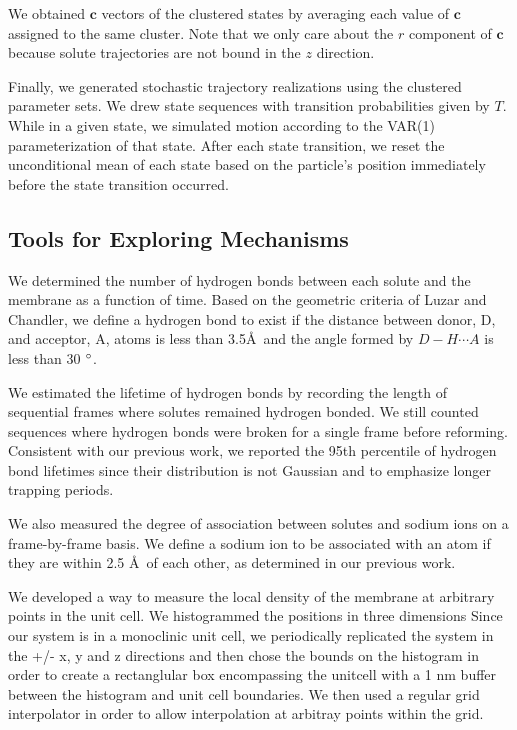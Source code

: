 \documentclass{article}
\begin{document}
  We obtained $\mathbf{c}$ vectors of the clustered states by averaging 
  each value of $\mathbf{c}$ assigned to the same cluster. Note that we only care
  about the $r$ component of $\mathbf{c}$ because solute trajectories are not 
  bound in the $z$ direction.
  
  Finally, we generated stochastic trajectory realizations using the clustered
  parameter sets. We drew state sequences with transition probabilities given by
  $T$. While in a given state, we simulated motion according to the VAR(1)
  parameterization of that state. After each state transition, we reset the 
  unconditional mean of each state based on the particle's position immediately
  before the state transition occurred.
  
  \subsection{Tools for Exploring Mechanisms}\label{method:interactions}
  
  We determined the number of hydrogen bonds between each solute and the membrane
  as a function of time. Based on the geometric criteria of Luzar and Chandler, we 
  define a hydrogen bond to exist if the distance between donor, D, and acceptor, 
  A, atoms is less than 3.5\AA~and the angle formed by $D-H \cdots A$ is less than 
  30 $\degree$.~\cite{luzar_effect_1996}
  
  We estimated the lifetime of hydrogen bonds by recording the length of 
  sequential frames where solutes remained hydrogen bonded. We still counted sequences
  where hydrogen bonds were broken for a single frame before reforming. Consistent
  with our previous work, we reported the 95th percentile of hydrogen bond lifetimes
  since their distribution is not Gaussian and to emphasize longer trapping periods. 
  
  We also measured the degree of association between solutes and sodium ions on a
  frame-by-frame basis. We define a sodium ion to be associated with an atom if they
  are within 2.5 \AA~of each other, as determined in our previous work.~\cite{coscia_chemically_2019}
  
  We developed a way to measure the local density of the membrane at arbitrary
  points in the unit cell. We histogrammed the positions in three dimensions
  Since our system is in a monoclinic unit cell, we periodically replicated
  the system in the +/- x, y and z directions and then chose the bounds on the
  histogram in order to create a rectanglular box encompassing the unitcell with
  a 1 nm buffer between the histogram and unit cell boundaries. We then used a regular
  grid interpolator in order to allow interpolation at arbitray points within the grid.
  
\end{document}
